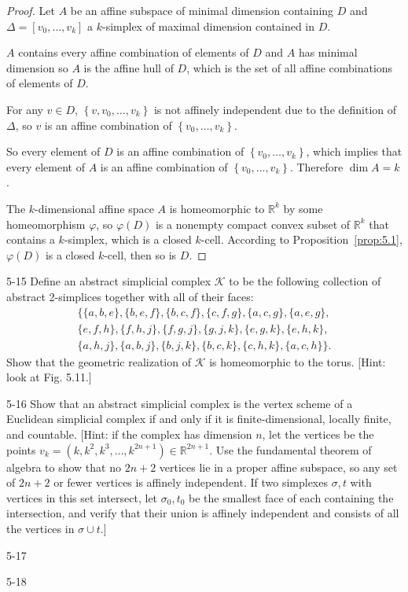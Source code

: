 \begin{proof}
	Let \( A \) be an affine subspace of minimal dimension containing \( D \) and \( \Delta = [v_{0}, \ldots, v_{k}] \) a \( k \)-simplex of maximal dimension contained in \( D \).

	\( A \) contains every affine combination of elements of \( D \) and \( A \) has minimal dimension so \( A \) is the affine hull of \( D \), which is the set of all affine combinations of elements of \( D \).

	For any \( v \in D \), \( \left\{ v, v_{0}, \ldots, v_{k} \right\} \) is not affinely independent due to the definition of \( \Delta \), so \( v \) is an affine combination of \( \left\{ v_{0}, \ldots, v_{k} \right\} \).

	So every element of \( D \) is an affine combination of \( \left\{ v_{0}, \ldots, v_{k} \right\} \), which implies that every element of \( A \) is an affine combination of \( \left\{ v_{0}, \ldots, v_{k} \right\} \). Therefore \( \dim A = k \).

	The \( k \)-dimensional affine space \( A \) is homeomorphic to \( \mathbb{R}^{k} \) by some homeomorphism \( \varphi \), so \( \varphi(D) \) is a nonempty compact convex subset of \( \mathbb{R}^{k} \) that contains a \( k \)-simplex, which is a closed \( k \)-cell. According to Proposition~\ref{prop:5.1}, \( \varphi(D) \) is a closed \( k \)-cell, then so is \( D \).
\end{proof}

\begin{problem}{5-15}\label{problem:5-15}
Define an abstract simplicial complex \( \mathcal{K} \) to be the following collection of abstract 2-simplices together with all of their faces:
\begin{multline*}
	\{ \{a, b, e\}, \{b, e, f\}, \{b, c, f\}, \{c, f, g\}, \{a, c, g\}, \{a, e, g\}, \\
	\{e, f, h\}, \{f, h, j\}, \{f, g, j\}, \{g, j, k\}, \{e, g, k\}, \{e, h, k\}, \\
	\{a, h, j\}, \{a, b, j\}, \{b, j, k\}, \{b, c, k\}, \{c, h, k\}, \{a, c, h\} \}.
\end{multline*}
Show that the geometric realization of \( \mathcal{K} \) is homeomorphic to the torus. [Hint: look at Fig. 5.11.]
\end{problem}

\begin{problem}{5-16}\label{problem:5-16}
Show that an abstract simplicial complex is the vertex scheme of a Euclidean simplicial complex if and only if it is finite-dimensional, locally finite, and countable. [Hint: if the complex has dimension \(n\), let the vertices be the points \( v_k = (k, k^2, k^3, \dots, k^{2n+1}) \in \mathbb{R}^{2n+1} \). Use the fundamental theorem of algebra to show that no \( 2n+2 \) vertices lie in a proper affine subspace, so any set of \( 2n+2 \) or fewer vertices is affinely independent. If two simplexes \( \sigma, t \) with vertices in this set intersect, let \( \sigma_{0}, t_{0} \) be the smallest face of each containing the intersection, and verify that their union is affinely independent and consists of all the vertices in \( \sigma \cup t \).]
\end{problem}

\begin{problem}{5-17}\label{problem:5-17}
\end{problem}

\begin{problem}{5-18}\label{problem:5-18}
\end{problem}
